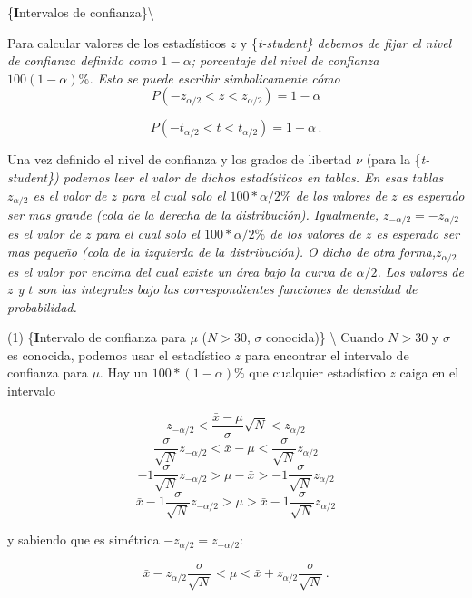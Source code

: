 \documentclass[
]{agujournal2019}
\begin{document}
\vspace{0.5cm}

\{\noindent \textbf Intervalos de confianza\}\textbackslash{}

Para calcular valores de los estadísticos \(z\) y \{\it t-student\}
debemos de fijar el nivel de confianza definido como \(1-\alpha\);
porcentaje del nivel de confianza \(100(1-\alpha)\%\). Esto se puede
escribir simbolicamente cómo
\[P(-z_{\alpha/2}<z<z_{\alpha/2})=1-\alpha\]

\[P(-t_{\alpha/2}<t<t_{\alpha/2})=1-\alpha\,.\]

Una vez definido el nivel de confianza y los grados de libertad \(\nu\)
(para la \{\it t-student\}) podemos leer el valor de dichos estadísticos
en tablas. En esas tablas \(z_{\alpha/2}\) es el valor de \(z\) para el
cual solo el \(100*{\alpha/2}\%\) de los valores de \(z\) es esperado
ser mas grande (cola de la derecha de la distribución). Igualmente,
\(z_{-\alpha/2}=-z_{\alpha/2}\) es el valor de \(z\) para el cual solo
el \(100*{\alpha/2}\%\) de los valores de \(z\) es esperado ser mas
pequeño (cola de la izquierda de la distribución). O dicho de otra
forma,\(z_{\alpha/2}\) es el valor por encima del cual existe un área
bajo la curva de \(\alpha/2\). Los valores de \(z\) y \(t\) son las
integrales bajo las correspondientes funciones de densidad de
probabilidad.

\begin{center}
\end{center}

\noindent (1) \{\textbf Intervalo de confianza para \(\mu\) (\(N>30\),
\(\sigma\) conocida)\} \textbackslash{} Cuando \(N>30\) y \(\sigma\) es
conocida, podemos usar el estadístico \(z\) para encontrar el intervalo
de confianza para \(\mu\). Hay un \(100*(1-\alpha)\%\) que cualquier
estadístico \(z\) caiga en el intervalo

\[z_{-\alpha/2}<\frac{\bar{x}-\mu}{\sigma}\sqrt{N}<z_{\alpha/2}\]
\[\frac{\sigma}{\sqrt{N}}z_{-\alpha/2}<{\bar{x}-\mu}<\frac{\sigma}{\sqrt{N}}z_{\alpha/2}\]
\[-1\frac{\sigma}{\sqrt{N}}z_{-\alpha/2}>{\mu-\bar{x}}>-1\frac{\sigma}{\sqrt{N}}z_{\alpha/2}\]
\[\bar{x}-1\frac{\sigma}{\sqrt{N}}z_{-\alpha/2}>\mu>\bar{x}-1\frac{\sigma}{\sqrt{N}}z_{\alpha/2}\]

y sabiendo que es simétrica \(-z_{\alpha/2}=z_{-\alpha/2}\):

\[\bar{x}-z_{\alpha/2}\frac{\sigma}{\sqrt{N}} < \mu <
   \bar{x}+z_{\alpha/2}\frac{\sigma}{\sqrt{N}}\,.\]
\end{document}
